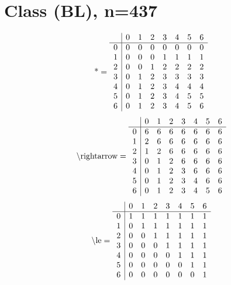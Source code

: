 \documentclass[11pt]{article}
\begin{document}
\section{Class (BL), n=437}
\[\text{*} = 
\begin{array}{r | r r r r r r r}
 & 0 & 1 & 2 & 3 & 4 & 5 & 6 \\ \hline
0 & 0 & 0 & 0 & 0 & 0 & 0 & 0 \\
1 & 0 & 0 & 0 & 1 & 1 & 1 & 1 \\
2 & 0 & 0 & 1 & 2 & 2 & 2 & 2 \\
3 & 0 & 1 & 2 & 3 & 3 & 3 & 3 \\
4 & 0 & 1 & 2 & 3 & 4 & 4 & 4 \\
5 & 0 & 1 & 2 & 3 & 4 & 5 & 5 \\
6 & 0 & 1 & 2 & 3 & 4 & 5 & 6 \\
\end{array}
\]
\[\text{\textbackslash rightarrow} = 
\begin{array}{r | r r r r r r r}
 & 0 & 1 & 2 & 3 & 4 & 5 & 6 \\ \hline
0 & 6 & 6 & 6 & 6 & 6 & 6 & 6 \\
1 & 2 & 6 & 6 & 6 & 6 & 6 & 6 \\
2 & 1 & 2 & 6 & 6 & 6 & 6 & 6 \\
3 & 0 & 1 & 2 & 6 & 6 & 6 & 6 \\
4 & 0 & 1 & 2 & 3 & 6 & 6 & 6 \\
5 & 0 & 1 & 2 & 3 & 4 & 6 & 6 \\
6 & 0 & 1 & 2 & 3 & 4 & 5 & 6 \\
\end{array}
\]
\[\text{\textbackslash le} = 
\begin{array}{r | r r r r r r r}
 & 0 & 1 & 2 & 3 & 4 & 5 & 6 \\ \hline
0 & 1 & 1 & 1 & 1 & 1 & 1 & 1 \\
1 & 0 & 1 & 1 & 1 & 1 & 1 & 1 \\
2 & 0 & 0 & 1 & 1 & 1 & 1 & 1 \\
3 & 0 & 0 & 0 & 1 & 1 & 1 & 1 \\
4 & 0 & 0 & 0 & 0 & 1 & 1 & 1 \\
5 & 0 & 0 & 0 & 0 & 0 & 1 & 1 \\
6 & 0 & 0 & 0 & 0 & 0 & 0 & 1 \\
\end{array}
\]
\end{document}
